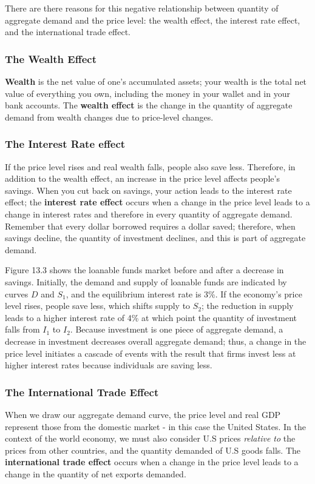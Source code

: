 \documentclass[11pt]{article} %
\begin{document}
There are there reasons for this negative relationship between quantity of aggregate demand and the price level: the wealth effect, the interest rate effect, and the international trade effect.

\subsubsection*{The Wealth Effect}
\textbf{Wealth} is the net value of one's accumulated assets; your wealth is the total net value of everything you own, including the money in your wallet and in your bank accounts. The \textbf{wealth effect} is the change in the quantity of aggregate demand from wealth changes due to price-level changes.

\subsubsection*{The Interest Rate effect}
If the price level rises and real wealth falls, people also save less. Therefore, in addition to the wealth effect, an increase in the price level affects people's savings. When you cut back on savings, your action leads to the interest rate effect; the \textbf{interest rate effect} occurs when a change in the price level leads to a change in interest rates and therefore in every quantity of aggregate demand. Remember that every dollar borrowed requires a dollar saved; therefore, when savings decline, the quantity of investment declines, and this is part of aggregate demand.

Figure 13.3 shows the loanable funds market before and after a decrease in savings. Initially, the demand and supply of loanable funds are indicated by curves \(D\) and \(S_1\), and the equilibrium interest rate is 3\%. If the economy's price level rises, people save less, which shifts supply to \(S_2\); the reduction in supply leads to a higher interest rate of 4\% at which point the quantity of investment falls from \(I_1\) to \(I_2\). Because investment is one piece of aggregate demand, a decrease in investment decreases overall aggregate demand; thus, a change in the price level initiates a cascade of events with the result that firms invest less at higher interest rates because individuals are saving less.

\subsubsection*{The International Trade Effect}
When we draw our aggregate demand curve, the price level and real GDP represent those from the domestic market - in this case the United States. In the context of the world economy, we must also consider U.S prices \textit{relative to} the prices from other countries, and the quantity demanded of U.S goods falls. The \textbf{international trade effect} occurs when a change in the price level leads to a change in the quantity of net exports demanded.
\end{document}
